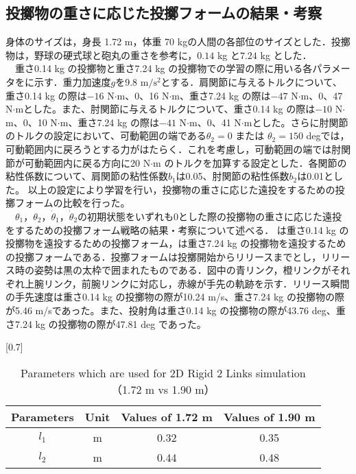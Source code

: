 \begin{small}
\subsection{投擲物の重さに応じた投擲フォームの結果・考察}
身体のサイズは，身長 1.72 m，体重 70 kgの人間の各部位のサイズとした．投擲物は，野球の硬式球と砲丸の重さを参考に，$0.14$ kg\cite{horiuchi} と$7.24$ kg\cite{haq} とした．\\
　重さ0.14 kg の投擲物と重さ7.24 kg の投擲物での学習の際に用いる各パラメータをに示す\cite{irving}．重力加速度$g$を9.8 $\mathrm{m/s^{2}}$とする．肩関節に与えるトルクについて、重さ0.14 kg の際は$-16$ N$\cdot$m、0、16 N$\cdot$m、重さ7.24 kg の際は$-47$ N$\cdot$m、0、47 N$\cdot$mとした。また、肘関節に与えるトルクについて、重さ0.14 kg の際は$-10$ N$\cdot$m、0、10 N$\cdot$m、重さ7.24 kg の際は$-41$ N$\cdot$m、0、41 N$\cdot$mとした。さらに肘関節のトルクの設定において、可動範囲の端である$\theta_{2} = 0$ または $\theta_{2} = 150$ degでは，可動範囲内に戻ろうとする力がはたらく．これを考慮し，可動範囲の端では肘関節が可動範囲内に戻る方向に20 N$\cdot$m のトルクを加算する設定とした．各関節の粘性係数について、肩関節の粘性係数$b_{1}$は0.05、肘関節の粘性係数$b_{2}$は0.01とした。
以上の設定により学習を行い，投擲物の重さに応じた遠投をするための投擲フォームの比較を行った。\\
　$\theta_{1}$，$\theta_{2}$，$\dot{\theta}_{1}$，$\dot{\theta}_{2}$の初期状態をいずれも0とした際の投擲物の重さに応じた遠投をするための投擲フォーム戦略の結果・考察について述べる．
は重さ0.14 kg の投擲物を遠投するための投擲フォーム，は重さ7.24 kg の投擲物を遠投するための投擲フォームである．投擲フォームは投擲開始からリリースまでとし，リリース時の姿勢は黒の太枠で囲まれたものである．図中の青リンク，橙リンクがそれぞれ上腕リンク，前腕リンクに対応し，赤線が手先の軌跡を示す．リリース瞬間の手先速度は重さ0.14 kg の投擲物の際が10.24 m/s、重さ7.24 kg の投擲物の際が5.46 m/sであった。また、投射角は重さ0.14 kg の投擲物の際が43.76 deg、重さ7.24 kg の投擲物の際が47.81 deg であった。
\begin{table}[tb]
  \begin{center}
    \caption{Parameters which are used for 2D Rigid 2 Links simulation（1.72 m vs 1.90 m）}
    \scalebox{0.7}[0.7]{
    \begin{tabular}{c|c|c|c}
      \hline
      Parameters & Unit & Values of 1.72 m & Values of 1.90 m \\
      \hline
      $l_{1}$ & m & 0.32 & 0.35 \\
      $l_{2}$ & m & 0.44 & 0.48 \\

\end{tabular}}
\end{center}
\end{table}
\end{small}
